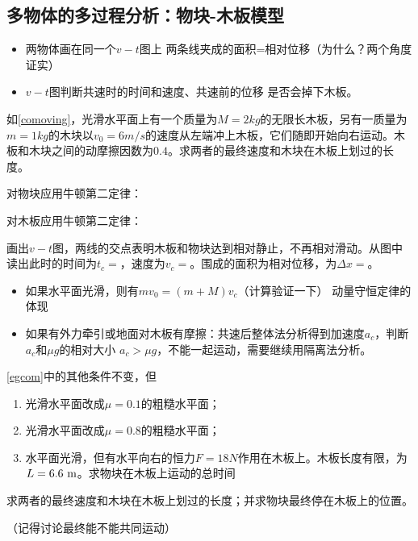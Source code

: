 \documentclass[a4paper,9pt]{ctexart}
\begin{document}
\subsection{多物体的多过程分析：物块-木板模型}
\begin{itemize}
\item
两物体画在同一个$v-t$图上 \so 两条线夹成的面积=相对位移（为什么？两个角度证实）
\item
$v-t$图判断共速时的时间和速度、共速前的位移 \so 是否会掉下木板。
\end{itemize}
\begin{eg} \label{egcom}
如\cref{comoving}，光滑水平面上有一个质量为$M = 2\unit{kg}$的无限长木板，另有一质量为$m = 1\unit{kg}$的木块以$v_0 = 6\unit{m/s}$的速度从左端冲上木板，它们随即开始向右运动。木板和木块之间的动摩擦因数为$0.4$。求两者的最终速度和木块在木板上划过的长度。
\end{eg}
\begin{ans}
对物块应用牛顿第二定律：
\par
对木板应用牛顿第二定律：
\par
画出$v-t$图，两线的交点表明木板和物块达到相对静止，不再相对滑动。从图中读出此时的时间为$t_c = $\hspace{2cm}，速度为$v_c =$\hspace{2cm}。围成的面积为相对位移，为$\Delta x =$\hspace{2cm}。
\vspace{4cm}
\end{ans}
\begin{itemize}
\item
如果水平面光滑，则有$mv_0 = (m+M)v_c$（计算验证一下） \so 动量守恒定律的体现

\item
如果有外力牵引或地面对木板有摩擦：共速后整体法分析得到加速度$a_c$，判断$a_c$和$\mu g$的相对大小 \so $a_c>\mu g$，不能一起运动，需要继续用隔离法分析。
\end{itemize}

\begin{eg}
\cref{egcom}中的其他条件不变，但
\begin{enumerate}
\item
光滑水平面改成$\mu = 0.1$的粗糙水平面；
\item
光滑水平面改成$\mu = 0.8$的粗糙水平面；
\item
水平面光滑，但有水平向右的恒力$F = 18\unit{N}$作用在木板上。木板长度有限，为$L = 6.6{\rm \ m}$。求物块在木板上运动的总时间
\end{enumerate}
求两者的最终速度和木块在木板上划过的长度；并求物块最终停在木板上的位置。
\end{eg}
\begin{ans}
（记得讨论最终能不能共同运动）
\vspace{8cm}
\end{ans}
\end{document}
